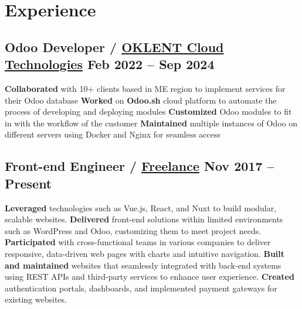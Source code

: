 \section*{Experience}
%
%
%
\subsection*{
  Odoo Developer / \href{https://oklent.com/}{OKLENT Cloud Technologies}
  \hspace*{\fill}
  \dateformat Feb 2022 -- Sep 2024
}
\begin{tasks}
  \task \textbf{Collaborated} with 10+ clients based in ME region to implement services for their Odoo database
  \task \textbf{Worked} on \textbf{Odoo.sh} cloud platform to automate the process of developing and deploying modules
  \task \textbf{Customized} Odoo modules to fit in with the workflow of the customer
  \task \textbf{Maintained} multiple instances of Odoo on different servers using Docker and Nginx for seamless access
\end{tasks}
%
%
\subsection*{
  Front-end Engineer / \href{https://bumbleboss.xyz/}{Freelance}
  \hspace*{\fill}
  \dateformat Nov 2017 -- Present
}
\begin{tasks}
  \task \textbf{Leveraged} technologies such as Vue.js, React, and Nuxt to build modular, scalable websites.
  \task \textbf{Delivered} front-end solutions within limited environments such as WordPress and Odoo, customizing them to meet project needs.
  \task \textbf{Participated} with cross-functional teams in various companies to deliver responsive, data-driven web pages with charts and intuitive navigation.
  \task \textbf{Built and maintained} websites that seamlessly integrated with back-end systems using REST APIs and third-party services to enhance user experience.
  \task \textbf{Created} authentication portals, dashboards, and implemented payment gateways for existing websites.
\end{tasks}
